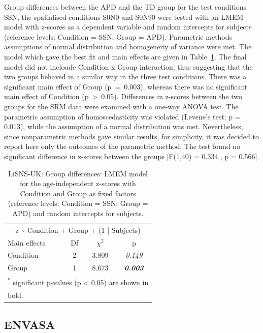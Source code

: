 \documentclass[a4paper, twoside]{templates/ociamthesis}
\begin{document}
Group differences between the APD and the TD group for the test conditions SSN, the spatialised conditions S0N0 and S0N90 were tested with an LMEM model with z-scores as a dependent variable and random intercepts for subjects (reference levels: Condition = SSN; Group = APD). Parametric methods assumptions of normal distribution and homogeneity of variance were met. The model which gave the best fit and main effects are given in Table~\ref{tab:LiSNS-zLMEMTab}. The final model did not incloude Condition x Group interaction, thus suggesting that the two groups behaved in a similar way in the three test conditions. There was a significant main effect of Group (p~=~0.003), whereas there was no significant main effect of Condition (p~\textgreater~0.05). Differences in z-scores between the two groups for the SRM data were examined with a one-way ANOVA test. The parametric assumption of homoscedasticity was violated (Levene's test; p = 0.013), while the assumption of a normal distribution was met. Nevertheless, since nonparametric methods gave similar results, for simplicity, it was decided to report here only the outcomes of the parametric method. The test found no significant difference in z-scores between the groups {[}F(1,40) = 0.334 , p = 0.566{]}.\\

\begin{table}

\caption{\label{tab:LiSNS-zLMEMTab}LiSNS-UK: Group differences: LMEM model for the age-independent z-scores with Condition and Group as fixed factors (reference levels: Condition = SSN; Group = APD) and random intercepts for subjects.}
\centering
\begin{tabular}[t]{lcc>{}c}
\toprule
\multicolumn{4}{c}{z \textasciitilde{} Condition + Group + (1 | Subjects)} \\
\cmidrule(l{3pt}r{3pt}){1-4}
Main effects & Df & $\chi^{2}$ & p\\
\midrule
Condition & 2 & 3.809 & \em{0.149}\\
Group & 1 & 8.673 & \em{\textbf{0.003}}\\
\bottomrule
\multicolumn{4}{l}{\textsuperscript{*} significant p-values (p < 0.05) are shown in}\\
\multicolumn{4}{l}{bold.}\\
\end{tabular}
\end{table}

\hypertarget{envasa}{%
\subsection{ENVASA}\label{envasa}}
\end{document}

